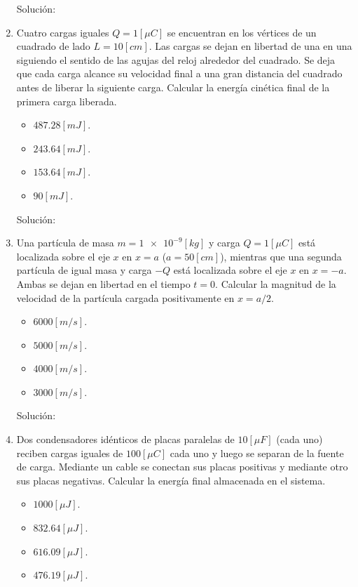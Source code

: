 \documentclass[letter,11pt]{article}
\begin{document}
\begin{enumerate}
Solución: \\

\item Cuatro cargas iguales $Q = 1 [\mu C]$ se encuentran en los vértices de un
cuadrado de lado $L = 10 [cm]$. Las cargas se dejan en libertad de una en una
siguiendo el sentido de las agujas del reloj alrededor del cuadrado. Se deja que
cada carga alcance su velocidad final a una gran distancia del cuadrado antes de
liberar la siguiente carga. Calcular la energía cinética final de la primera
carga liberada.

\begin{itemize}
    \item $487.28 [mJ]$.
    \item $243.64 [mJ]$.
    \item $153.64 [mJ]$.
    \item $ 90    [mJ]$.
\end{itemize}

Solución: \\

\item Una partícula de masa $m = \num{1e-9} [kg]$ y carga $Q = 1 [\mu C]$ está
localizada sobre el eje $x$ en $x = a$ ($a = 50 [cm]$), mientras que una segunda
partícula de igual masa y carga $-Q$ está localizada sobre el eje $x$ en
$x = -a$. Ambas se dejan en libertad en el tiempo $t = 0$. Calcular la magnitud
de la velocidad de la partícula cargada positivamente en $x = a/2$.

\begin{itemize}
    \item $6000 [m/s]$.
    \item $5000 [m/s]$.
    \item $4000 [m/s]$.
    \item $3000 [m/s]$.
\end{itemize}

Solución: \\

\item Dos condensadores idénticos de placas paralelas de $10 [\mu F]$ (cada uno)
reciben cargas iguales de $100 [\mu C]$ cada uno y luego se separan de la fuente
de carga. Mediante un cable se conectan sus placas positivas y mediante otro sus
placas negativas. Calcular la energía final almacenada en el sistema.

\begin{itemize}
    \item $1000    [\mu J]$.
    \item $ 832.64 [\mu J]$.
    \item $ 616.09 [\mu J]$.
    \item $ 476.19 [\mu J]$.
\end{itemize}


\end{enumerate}
\end{document}

